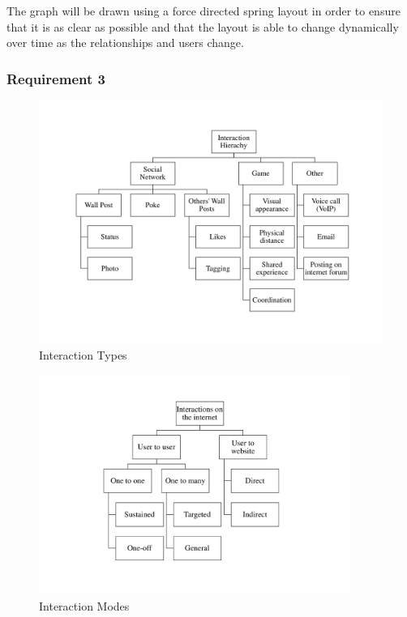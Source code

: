 \documentclass[12pt,a4paper]{article}
\begin{document}
The graph will be drawn using a force directed spring layout in order to ensure that it is as clear as possible and that the layout is able to change dynamically over time as the relationships and users change.

\subsubsection{Requirement 3}
\begin{figure}[htb]
\begin{center}
\caption{Interaction Types}
\label{fig:types}
\includegraphics[width=6in]{InteractionTypes.pdf}
\end{center}\end{figure}

\begin{figure}[htb]
\begin{center}
\caption{Interaction Modes}
\label{fig:modes}
\includegraphics[width=4in]{CategorisationsInteractions}
\end{center}
\end{figure}
\end{document}
